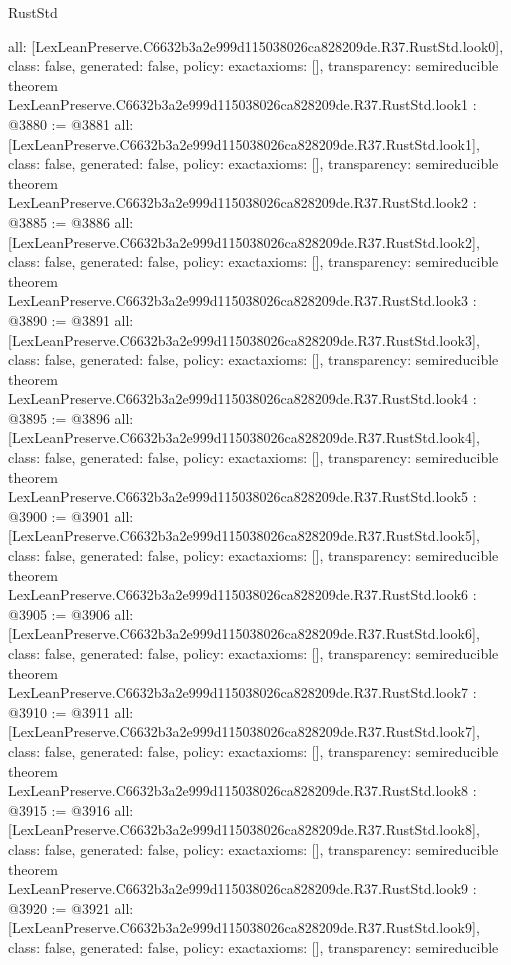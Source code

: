 \begin{lexlean}{RustStd}
\begin{coremodule}
{  all: [LexLeanPreserve.C6632b3a2e999d115038026ca828209de.R37.RustStd.look0],
  class: false,
  generated: false,
  policy: exact{axioms: []},
  transparency: semireducible
}
theorem LexLeanPreserve.C6632b3a2e999d115038026ca828209de.R37.RustStd.look1 : @3880 := @3881 {
  all: [LexLeanPreserve.C6632b3a2e999d115038026ca828209de.R37.RustStd.look1],
  class: false,
  generated: false,
  policy: exact{axioms: []},
  transparency: semireducible
}
theorem LexLeanPreserve.C6632b3a2e999d115038026ca828209de.R37.RustStd.look2 : @3885 := @3886 {
  all: [LexLeanPreserve.C6632b3a2e999d115038026ca828209de.R37.RustStd.look2],
  class: false,
  generated: false,
  policy: exact{axioms: []},
  transparency: semireducible
}
theorem LexLeanPreserve.C6632b3a2e999d115038026ca828209de.R37.RustStd.look3 : @3890 := @3891 {
  all: [LexLeanPreserve.C6632b3a2e999d115038026ca828209de.R37.RustStd.look3],
  class: false,
  generated: false,
  policy: exact{axioms: []},
  transparency: semireducible
}
theorem LexLeanPreserve.C6632b3a2e999d115038026ca828209de.R37.RustStd.look4 : @3895 := @3896 {
  all: [LexLeanPreserve.C6632b3a2e999d115038026ca828209de.R37.RustStd.look4],
  class: false,
  generated: false,
  policy: exact{axioms: []},
  transparency: semireducible
}
theorem LexLeanPreserve.C6632b3a2e999d115038026ca828209de.R37.RustStd.look5 : @3900 := @3901 {
  all: [LexLeanPreserve.C6632b3a2e999d115038026ca828209de.R37.RustStd.look5],
  class: false,
  generated: false,
  policy: exact{axioms: []},
  transparency: semireducible
}
theorem LexLeanPreserve.C6632b3a2e999d115038026ca828209de.R37.RustStd.look6 : @3905 := @3906 {
  all: [LexLeanPreserve.C6632b3a2e999d115038026ca828209de.R37.RustStd.look6],
  class: false,
  generated: false,
  policy: exact{axioms: []},
  transparency: semireducible
}
theorem LexLeanPreserve.C6632b3a2e999d115038026ca828209de.R37.RustStd.look7 : @3910 := @3911 {
  all: [LexLeanPreserve.C6632b3a2e999d115038026ca828209de.R37.RustStd.look7],
  class: false,
  generated: false,
  policy: exact{axioms: []},
  transparency: semireducible
}
theorem LexLeanPreserve.C6632b3a2e999d115038026ca828209de.R37.RustStd.look8 : @3915 := @3916 {
  all: [LexLeanPreserve.C6632b3a2e999d115038026ca828209de.R37.RustStd.look8],
  class: false,
  generated: false,
  policy: exact{axioms: []},
  transparency: semireducible
}
theorem LexLeanPreserve.C6632b3a2e999d115038026ca828209de.R37.RustStd.look9 : @3920 := @3921 {
  all: [LexLeanPreserve.C6632b3a2e999d115038026ca828209de.R37.RustStd.look9],
  class: false,
  generated: false,
  policy: exact{axioms: []},
  transparency: semireducible
}
\end{coremodule}
\end{lexlean}
